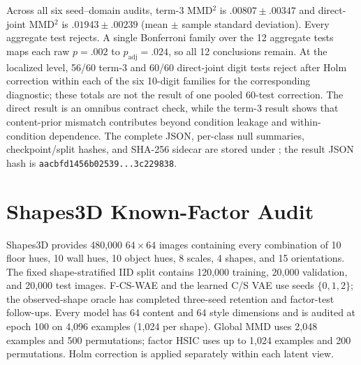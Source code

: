 Across all six seed--domain audits, term-3 MMD$^2$ is
$.00807\pm.00347$ and direct-joint MMD$^2$ is $.01943\pm.00239$ (mean
$\pm$ sample standard deviation).  Every aggregate test rejects.  A single
Bonferroni family over the 12 aggregate tests maps each raw $p=.002$ to
$p_{\mathrm{adj}}=.024$, so all 12 conclusions remain.  At the localized
level, 56/60 term-3 and 60/60 direct-joint digit tests reject after Holm
correction within each of the six 10-digit families for the corresponding
diagnostic; these totals are not the result of one pooled 60-test correction.
The direct result is an omnibus contract check, while the term-3
result shows that content-prior mismatch contributes beyond condition leakage
and within-condition dependence.  The complete JSON, per-class null summaries,
checkpoint/split hashes, and SHA-256 sidecar are stored under
; the result JSON hash is
\texttt{aacbfd1456b02539...3c229838}.

\section{Shapes3D Known-Factor Audit}
\label{app:shapes3d}

Shapes3D provides 480,000 $64\times64$ images containing every combination of
10 floor hues, 10 wall hues, 10 object hues, 8 scales, 4 shapes, and 15
orientations.  The fixed shape-stratified IID split contains 120,000 training,
20,000 validation, and 20,000 test images.  F-CS-WAE and the learned C/S VAE
use seeds $\{0,1,2\}$; the observed-shape oracle has completed three-seed
retention and factor-test follow-ups.  Every model has
64 content and 64 style dimensions and is audited at epoch 100 on 4,096
examples (1,024 per shape).  Global MMD uses 2,048 examples and 500
permutations; factor HSIC uses
up to 1,024 examples and 200 permutations.  Holm correction is applied
separately within each latent view.

\begin{table}[ht]
\caption{Completed three-seed Shapes3D replication.  Entries are rounded
means over seeds $\{0,1,2\}$.  The observed-shape oracle remains a seed-0
auxiliary control and is reported in the main paper.}
\label{tab:shapes3d-aggregate}
\centering
\scriptsize
\setlength{\tabcolsep}{3.5pt}
\end{table}

